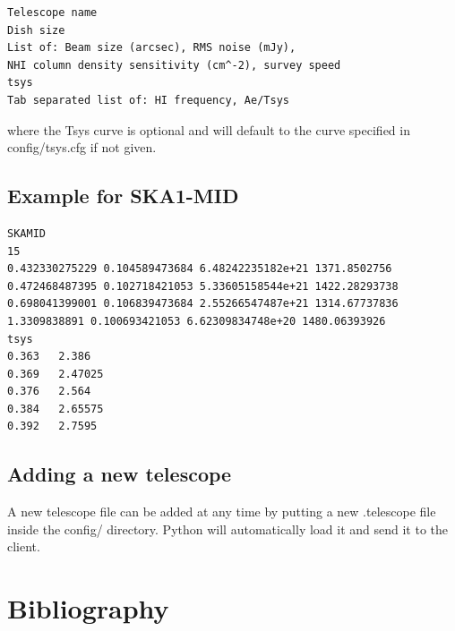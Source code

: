 \documentclass[11pt]{article}
\begin{document}
\begin{verbatim}
Telescope name
Dish size
List of: Beam size (arcsec), RMS noise (mJy), 
NHI column density sensitivity (cm^-2), survey speed
tsys
Tab separated list of: HI frequency, Ae/Tsys
\end{verbatim}
where the Tsys curve is optional and will default to the curve specified in config/tsys.cfg if not given. \subsection{Example for SKA1-MID}
\begin{verbatim}
SKAMID
15 
0.432330275229 0.104589473684 6.48242235182e+21 1371.8502756
0.472468487395 0.102718421053 5.33605158544e+21 1422.28293738
0.698041399001 0.106839473684 2.55266547487e+21 1314.67737836
1.3309838891 0.100693421053 6.62309834748e+20 1480.06393926
tsys
0.363	2.386
0.369	2.47025
0.376	2.564
0.384	2.65575
0.392	2.7595
\end{verbatim}
\subsection{Adding a new telescope}
A new telescope file can be added at any time by putting a new .telescope file inside the config/ directory. Python will automatically load it and send it to the client.

\section{Bibliography}
\printbibliography
\end{document}
